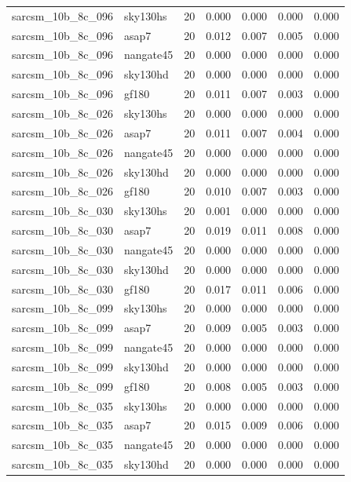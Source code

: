 \begin{tabular}{llrrrrr}
sarcsm\_10b\_8c\_096 & sky130hs & 20 & 0.000 & 0.000 & 0.000 & 0.000 \\
sarcsm\_10b\_8c\_096 & asap7 & 20 & 0.012 & 0.007 & 0.005 & 0.000 \\
sarcsm\_10b\_8c\_096 & nangate45 & 20 & 0.000 & 0.000 & 0.000 & 0.000 \\
sarcsm\_10b\_8c\_096 & sky130hd & 20 & 0.000 & 0.000 & 0.000 & 0.000 \\
sarcsm\_10b\_8c\_096 & gf180 & 20 & 0.011 & 0.007 & 0.003 & 0.000 \\
sarcsm\_10b\_8c\_026 & sky130hs & 20 & 0.000 & 0.000 & 0.000 & 0.000 \\
sarcsm\_10b\_8c\_026 & asap7 & 20 & 0.011 & 0.007 & 0.004 & 0.000 \\
sarcsm\_10b\_8c\_026 & nangate45 & 20 & 0.000 & 0.000 & 0.000 & 0.000 \\
sarcsm\_10b\_8c\_026 & sky130hd & 20 & 0.000 & 0.000 & 0.000 & 0.000 \\
sarcsm\_10b\_8c\_026 & gf180 & 20 & 0.010 & 0.007 & 0.003 & 0.000 \\
sarcsm\_10b\_8c\_030 & sky130hs & 20 & 0.001 & 0.000 & 0.000 & 0.000 \\
sarcsm\_10b\_8c\_030 & asap7 & 20 & 0.019 & 0.011 & 0.008 & 0.000 \\
sarcsm\_10b\_8c\_030 & nangate45 & 20 & 0.000 & 0.000 & 0.000 & 0.000 \\
sarcsm\_10b\_8c\_030 & sky130hd & 20 & 0.000 & 0.000 & 0.000 & 0.000 \\
sarcsm\_10b\_8c\_030 & gf180 & 20 & 0.017 & 0.011 & 0.006 & 0.000 \\
sarcsm\_10b\_8c\_099 & sky130hs & 20 & 0.000 & 0.000 & 0.000 & 0.000 \\
sarcsm\_10b\_8c\_099 & asap7 & 20 & 0.009 & 0.005 & 0.003 & 0.000 \\
sarcsm\_10b\_8c\_099 & nangate45 & 20 & 0.000 & 0.000 & 0.000 & 0.000 \\
sarcsm\_10b\_8c\_099 & sky130hd & 20 & 0.000 & 0.000 & 0.000 & 0.000 \\
sarcsm\_10b\_8c\_099 & gf180 & 20 & 0.008 & 0.005 & 0.003 & 0.000 \\
sarcsm\_10b\_8c\_035 & sky130hs & 20 & 0.000 & 0.000 & 0.000 & 0.000 \\
sarcsm\_10b\_8c\_035 & asap7 & 20 & 0.015 & 0.009 & 0.006 & 0.000 \\
sarcsm\_10b\_8c\_035 & nangate45 & 20 & 0.000 & 0.000 & 0.000 & 0.000 \\
sarcsm\_10b\_8c\_035 & sky130hd & 20 & 0.000 & 0.000 & 0.000 & 0.000 \\

\end{tabular}
